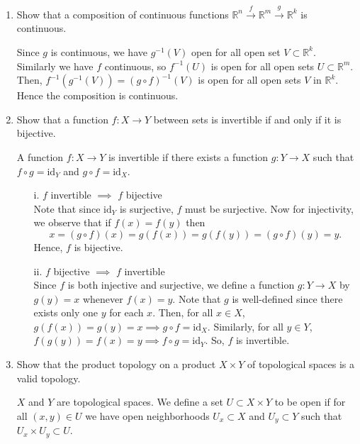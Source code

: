 \documentclass[12pt]{article}
\newcommand{\rl}{\mathbb{R}}
\newcommand{\id}{\text{id}}
\begin{document}
\begin{enumerate}
\item  Show that a composition of continuous functions
$\rl^n\xrightarrow{f}\rl^m\xrightarrow{g}\rl^k$ is continuous.

\begin{mybox}

  Since $g$ is continuous, we have $g^{-1}(V)$ open for
  all open set $V\subset \rl^k$. Similarly we have $f$
  continuous, so $f^{-1}(U)$ is open for all open sets
  $U\subset \rl^m$. Then, $f^{-1}(g^{-1}(V))=
  (g\circ f)^{-1}(V)$ is open for all open sets $V$ in
  $\rl^k$. Hence the composition is continuous.
\end{mybox}
 
 
\item Show that a function $f : X \to Y$ between sets is
invertible if and only if it is bijective.

\begin{mybox}

  A function $f:X\to Y$ is invertible if there exists a
  function $g:Y\to X$ such that $f\circ g= \id_Y$ and
  $g\circ f=\id_X$.
  \begin{enumerate}
    \item[i.]
      $f$ invertible $\implies$ $f$ bijective\\
      Note that since $\id_Y$ is surjective, $f$ must be
      surjective. Now for injectivity, we observe that
      if $f(x) =f(y)$ then $$x=(g\circ f)(x)
      =g(f(x))=g(f(y))=(g\circ f)(y)=y.$$
      Hence, $f$ is bijective.
    \item[ii.]
      $f$ bijective $\implies$ $f$ invertible\\
      Since $f$ is both injective and surjective,
      we define a function $g:Y\to X$ by
      $g(y)=x$ whenever $f(x)=y$. Note that $g$ is 
      well-defined since there exists only one $y$ for
      each $x$. Then, for all
      $x\in X$,
      $g(f(x)) = g(y)=x \implies g\circ f=\id_X$.
      Similarly, for all $y\in Y$, $f(g(y))=f(x)=y
      \implies f\circ g=\id_Y$. So, $f$ is invertible.
  \end{enumerate}
\end{mybox}


\item Show that the product topology on a product
$X \times Y$ of topological spaces is a valid
topology.

\begin{mybox}

  $X$ and $Y$ are topological spaces.
  We define a set $U\subset X\times Y$ to be open if
  for all $(x,y)\in U$ we have open neighborhoods $U_x
  \subset X$ and $U_y\subset Y$ such that
  $U_x\times U_y\subset U$.


\end{mybox}
\end{enumerate}
\end{document}
